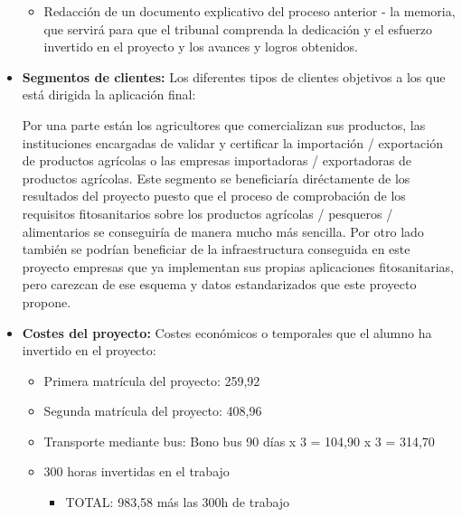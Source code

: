 \begin{itemize}
\begin{itemize}
\item Redacción de un documento explicativo del proceso anterior - la memoria, que servirá para que el tribunal comprenda la dedicación y el esfuerzo invertido en el proyecto y los avances y logros obtenidos.
\end{itemize}
\item \textbf{Segmentos de clientes:} Los diferentes tipos de clientes objetivos a los que está dirigida la aplicación final: \par Por una parte están los  agricultores que comercializan sus productos, las instituciones encargadas de validar y certificar la importación / exportación  de productos agrícolas o las empresas importadoras / exportadoras de productos agrícolas. Este segmento se beneficiaría diréctamente de los resultados del proyecto puesto que el proceso de comprobación de los requisitos fitosanitarios sobre los productos agrícolas / pesqueros / alimentarios se conseguiría de manera mucho más sencilla. Por otro lado también se podrían beneficiar de la infraestructura conseguida en este proyecto empresas que ya implementan sus propias aplicaciones fitosanitarias, pero carezcan de ese esquema y datos estandarizados que este proyecto propone.


\item \textbf{Costes del proyecto:} Costes económicos o temporales que el alumno ha invertido en el proyecto:
\begin{itemize}
\item Primera matrícula del proyecto: 259,92
\item Segunda matrícula del proyecto: 408,96
\item Transporte mediante bus: Bono bus 90 días x 3 = 104,90 x 3 = 314,70
\item 300 horas invertidas en el trabajo
\begin{itemize}
\item TOTAL: 983,58 más las 300h de trabajo
\end{itemize}
\end{itemize}
\end{itemize}

